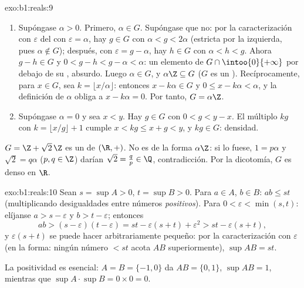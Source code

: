 \begin{solution}{exo:b1:reals:9}
\begin{enumerate}
  \item Supóngase $\alpha > 0$. Primero, $\alpha \in G$. Supóngase que
        no: por la caracterización con $\varepsilon$ del  con
        $\varepsilon = \alpha$, hay $g \in G$ con $\alpha < g <
        2\alpha$ (estricta por la izquierda, pues $\alpha \notin G$);
        después, con $\varepsilon = g - \alpha$, hay $h \in G$ con
        $\alpha < h < g$. Ahora $g - h \in G$ y $0 < g - h < g -
        \alpha < \alpha$: un elemento de $G \cap \intoo{0}{+\infty}$
        por debajo de su , absurdo. Luego $\alpha \in G$, y
        $\alpha\Z \subseteq G$ ($G$ es un ). Recíprocamente, para
        $x \in G$, sea $k = \lfloor x/\alpha \rfloor$: entonces
        $x - k\alpha \in G$ y $0 \leq x - k\alpha < \alpha$, y la
        definición de $\alpha$ obliga a $x - k\alpha = 0$. Por tanto,
        $G = \alpha\Z$.
  \item Supóngase $\alpha = 0$ y sea $x < y$. Hay $g \in G$ con
        $0 < g < y - x$. El múltiplo $kg$ con $k = \lfloor x/g
        \rfloor + 1$ cumple $x < kg \leq x + g < y$, y $kg \in G$:
        densidad.
\end{enumerate}
$G = \Z + \sqrt 2\,\Z$ es un  de $(\R, +)$. No es de la forma
$\alpha\Z$: si lo fuese, $1 = p\alpha$ y $\sqrt 2 = q\alpha$
($p, q \in \Z$) darían $\sqrt 2 = \frac qp \in \Q$, contradicción. Por
la dicotomía, $G$ es denso en $\R$.
\end{solution}

\begin{solution}{exo:b1:reals:10}
Sean $s = \sup A > 0$, $t = \sup B > 0$. Para $a \in A$, $b \in B$:
$ab \leq st$ (multiplicando desigualdades entre números
\emph{positivos}). Para $0 < \varepsilon < \min(s, t)$: elíjanse
$a > s - \varepsilon$ y $b > t - \varepsilon$; entonces
\[
ab > (s - \varepsilon)(t - \varepsilon)
= st - \varepsilon(s + t) + \varepsilon^2
> st - \varepsilon (s + t),
\]
y $\varepsilon(s+t)$ se puede hacer arbitrariamente pequeño: por la
caracterización con $\varepsilon$ (en la forma: ningún número $< st$
acota $AB$ superiormente), $\sup AB = st$.

La positividad es esencial: $A = B = \{-1, 0\}$ da $AB = \{0, 1\}$,
$\sup AB = 1$, mientras que $\sup A \cdot \sup B = 0 \times 0 = 0$.
\end{solution}

